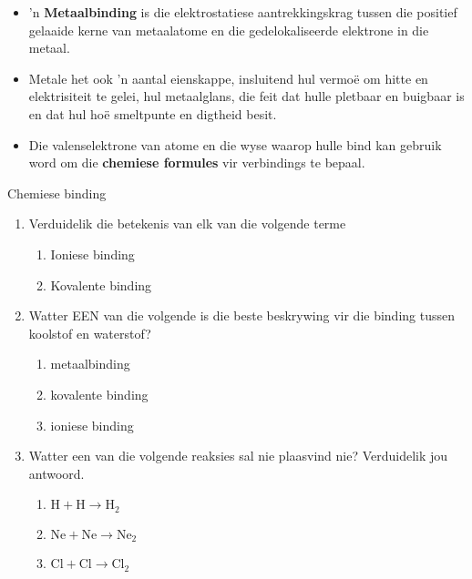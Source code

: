 \begin{itemize}[noitemsep]
\item 'n \textbf{Metaalbinding} is die elektrostatiese aantrekkingskrag tussen die positief gelaaide kerne van metaalatome en die gedelokaliseerde elektrone in die metaal.
\item Metale het ook 'n aantal eienskappe, insluitend hul vermo\"{e} om hitte en elektrisiteit te gelei, hul metaalglans, die feit dat hulle pletbaar en buigbaar is en dat hul ho\"{e} smeltpunte en digtheid besit.
\item Die valenselektrone van atome en die wyse waarop hulle bind kan gebruik word om die \textbf{chemiese formules} vir verbindings te bepaal.
\end{itemize}
\label{m38689*secfhsst!!!underscore!!!id1181}
            \begin{eocexercises}{Chemiese binding}
            \nopagebreak
      \label{m38689*id147820}\begin{enumerate}[noitemsep, label=\textbf{\arabic*}. ] 
            \label{m38689*uid158}\item Verduidelik die betekenis van elk van die volgende terme
\label{m38689*id147842}\begin{enumerate}[noitemsep, label=\textbf{\alph*}. ] 
            \label{m38689*uid159}\item Ioniese binding
\label{m38689*uid160}\item Kovalente binding
\end{enumerate}
                \label{m38689*uid162}\item Watter EEN van die volgende is die beste beskrywing vir die binding tussen koolstof en waterstof?
\label{m38689*id147923}\begin{enumerate}[noitemsep, label=\textbf{\alph*}. ] 
            \label{m38689*uid163}\item metaalbinding
\label{m38689*uid164}\item kovalente binding
\label{m38689*uid165}\item ioniese binding
\end{enumerate}
                \label{m38689*uid171}\item Watter een van die volgende reaksies sal nie plaasvind nie? Verduidelik jou antwoord.
\label{m38689*id148047}\begin{enumerate}[noitemsep, label=\textbf{\alph*}. ] 
            \label{m38689*uid172}\item $\mathrm{H}+\mathrm{H}\to {\mathrm{H}}_{2}$\label{m38689*uid173}\item $\mathrm{Ne}+\mathrm{Ne}\to {\mathrm{Ne}}_{2}$\label{m38689*uid174}\item $\mathrm{Cl}+\mathrm{Cl}\to {\mathrm{Cl}}_{2}$\end{enumerate}

\end{enumerate}
\end{eocexercises}
